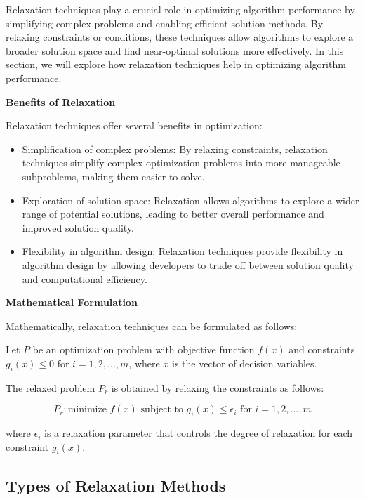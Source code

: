 \documentclass[12pt]{book} %
\begin{document}
Relaxation techniques play a crucial role in optimizing algorithm performance by simplifying complex problems and enabling efficient solution methods. By relaxing constraints or conditions, these techniques allow algorithms to explore a broader solution space and find near-optimal solutions more effectively. In this section, we will explore how relaxation techniques help in optimizing algorithm performance.

\textbf{Benefits of Relaxation}

Relaxation techniques offer several benefits in optimization:

\begin{itemize}
    \item Simplification of complex problems: By relaxing constraints, relaxation techniques simplify complex optimization problems into more manageable subproblems, making them easier to solve.
    \item Exploration of solution space: Relaxation allows algorithms to explore a wider range of potential solutions, leading to better overall performance and improved solution quality.
    \item Flexibility in algorithm design: Relaxation techniques provide flexibility in algorithm design by allowing developers to trade off between solution quality and computational efficiency.
\end{itemize}

\textbf{Mathematical Formulation}

Mathematically, relaxation techniques can be formulated as follows:

Let \(P\) be an optimization problem with objective function \(f(x)\) and constraints \(g_i(x) \leq 0\) for \(i = 1, 2, ..., m\), where \(x\) is the vector of decision variables.

The relaxed problem \(P_r\) is obtained by relaxing the constraints as follows:

\[
P_r: \text{minimize } f(x) \text{ subject to } g_i(x) \leq \epsilon_i \text{ for } i = 1, 2, ..., m
\]

where \(\epsilon_i\) is a relaxation parameter that controls the degree of relaxation for each constraint \(g_i(x)\).

\subsection{Types of Relaxation Methods}
\end{document}
